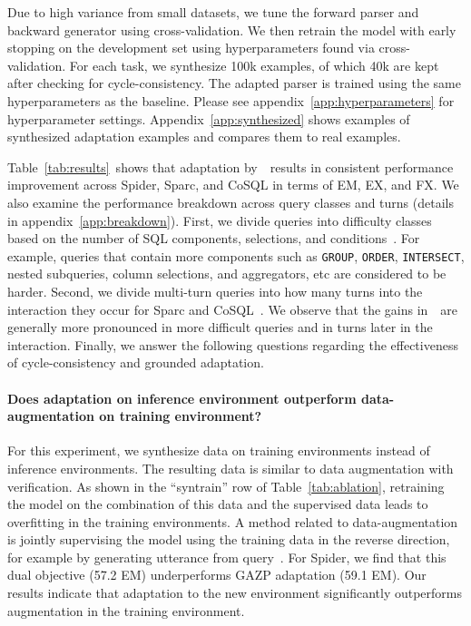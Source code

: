 \documentclass[11pt,a4paper]{article}
\begin{document}
Due to high variance from small datasets, we tune the forward parser and backward generator using cross-validation.
We then retrain the model with early stopping on the development set using hyperparameters found via cross-validation.
For each task, we synthesize 100k examples, of which 40k are kept after checking for cycle-consistency.
The adapted parser is trained using the same hyperparameters as the baseline.
Please see appendix~\ref{app:hyperparameters} for hyperparameter settings.
Appendix~\ref{app:synthesized} shows examples of synthesized adaptation examples and compares them to real examples.


Table~\ref{tab:results}~shows that adaptation by~\modelnameshort~results in consistent performance improvement across Spider, Sparc, and CoSQL in terms of EM, EX, and FX.
We also examine the performance breakdown across query classes and turns (details in appendix~\ref{app:breakdown}).
First, we divide queries into difficulty classes based on the number of SQL components, selections, and conditions~\citep{yu2018spider}.
For example, queries that contain more components such as \texttt{GROUP}, \texttt{ORDER}, \texttt{INTERSECT}, nested subqueries, column selections, and aggregators, etc are considered to be harder.
Second, we divide multi-turn queries into how many turns into the interaction they occur for Sparc and CoSQL~\citep{yu2019sparc,yu2019cosql}.
We observe that the gains in~\modelnameshort~are generally more pronounced in more difficult queries and in turns later in the interaction. 
Finally, we answer the following questions regarding the effectiveness of cycle-consistency and grounded adaptation.



\paragraph{Does adaptation on inference environment outperform data-augmentation on training environment?}
For this experiment, we synthesize data on training environments instead of inference environments.
The resulting data is similar to data augmentation with verification.
As shown in the ``syntrain'' row of Table~\ref{tab:ablation}, retraining the model on the combination of this data and the supervised data leads to overfitting in the training environments.
A method related to data-augmentation is jointly supervising the model using the training data in the reverse direction, for example by generating utterance from query~\citep{fried2018speaker,cao2019dual}.
For Spider, we find that this dual objective (57.2 EM) underperforms GAZP adaptation (59.1 EM).
Our results indicate that adaptation to the new environment significantly outperforms augmentation in the training environment.
\end{document}
